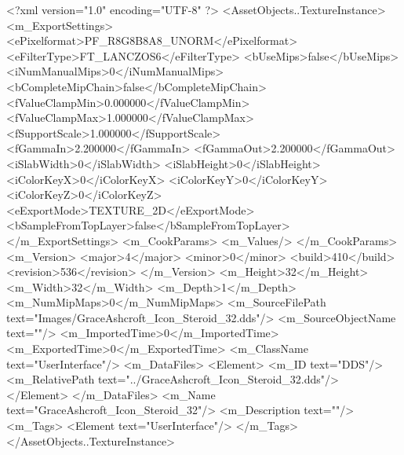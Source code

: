 <?xml version="1.0" encoding="UTF-8" ?>
<AssetObjects..TextureInstance>
	<m_ExportSettings>
		<ePixelformat>PF_R8G8B8A8_UNORM</ePixelformat>
		<eFilterType>FT_LANCZOS6</eFilterType>
		<bUseMips>false</bUseMips>
		<iNumManualMips>0</iNumManualMips>
		<bCompleteMipChain>false</bCompleteMipChain>
		<fValueClampMin>0.000000</fValueClampMin>
		<fValueClampMax>1.000000</fValueClampMax>
		<fSupportScale>1.000000</fSupportScale>
		<fGammaIn>2.200000</fGammaIn>
		<fGammaOut>2.200000</fGammaOut>
		<iSlabWidth>0</iSlabWidth>
		<iSlabHeight>0</iSlabHeight>
		<iColorKeyX>0</iColorKeyX>
		<iColorKeyY>0</iColorKeyY>
		<iColorKeyZ>0</iColorKeyZ>
		<eExportMode>TEXTURE_2D</eExportMode>
		<bSampleFromTopLayer>false</bSampleFromTopLayer>
	</m_ExportSettings>
	<m_CookParams>
		<m_Values/>
	</m_CookParams>
	<m_Version>
		<major>4</major>
		<minor>0</minor>
		<build>410</build>
		<revision>536</revision>
	</m_Version>
	<m_Height>32</m_Height>
	<m_Width>32</m_Width>
	<m_Depth>1</m_Depth>
	<m_NumMipMaps>0</m_NumMipMaps>
	<m_SourceFilePath text="Images/GraceAshcroft_Icon_Steroid_32.dds"/>
	<m_SourceObjectName text=""/>
	<m_ImportedTime>0</m_ImportedTime>
	<m_ExportedTime>0</m_ExportedTime>
	<m_ClassName text="UserInterface"/>
	<m_DataFiles>
		<Element>
			<m_ID text="DDS"/>
			<m_RelativePath text="../GraceAshcroft_Icon_Steroid_32.dds"/>
		</Element>
	</m_DataFiles>
	<m_Name text="GraceAshcroft_Icon_Steroid_32"/>
	<m_Description text=""/>
	<m_Tags>
		<Element text="UserInterface"/>
	</m_Tags>
</AssetObjects..TextureInstance>
